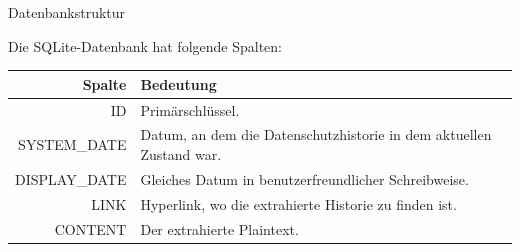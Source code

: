 \documentclass[halfparskip]{beamer}
\begin{document}
\begin{frame}{Datenbankstruktur}
	\begin{block}{Die SQLite-Datenbank hat folgende Spalten:}
		\begin{tabularx}{\textwidth}{|r|X|}
			\hline
			\textbf{Spalte} & \textbf{Bedeutung} \\ \hline \hline
			ID & Primärschlüssel. \\ \hline
			SYSTEM\_DATE & Datum, an dem die Datenschutzhistorie in dem aktuellen Zustand war.\\ \hline
			DISPLAY\_DATE & Gleiches Datum in benutzerfreundlicher Schreibweise. \\ \hline
			LINK & Hyperlink, wo die extrahierte Historie zu finden ist.\\ \hline
			CONTENT & Der extrahierte Plaintext.\\ \hline
		\end{tabularx}
	\end{block}
\end{frame}
\end{document}
